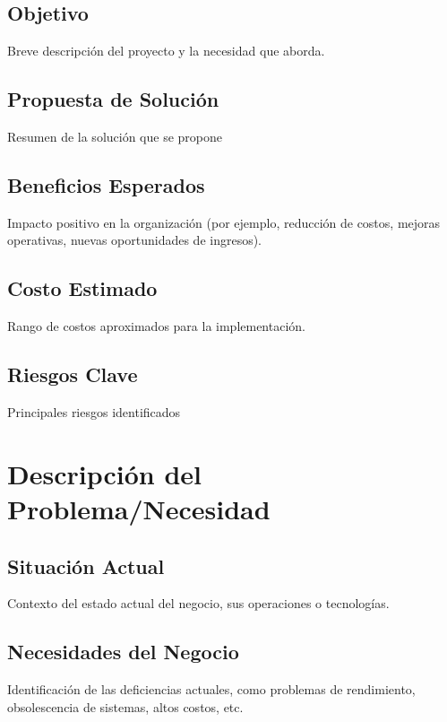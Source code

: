 \documentclass[a4paper,11pt]{article}
\begin{document}
\subsection{Objetivo}
Breve descripción del proyecto y la necesidad que aborda.

\subsection{Propuesta de Solución}
Resumen de la solución que se propone

\subsection{Beneficios Esperados}
Impacto positivo en la organización (por ejemplo, reducción de costos, mejoras operativas, nuevas oportunidades de ingresos).

\subsection{Costo Estimado}
Rango de costos aproximados para la implementación.

\subsection{Riesgos Clave}
Principales riesgos identificados


\titleformat{\section}{\normalfont\Large\bfseries}{\thesection}{1em}{}
\renewcommand{\thesection}{\Roman{section}}
\section{Descripción del Problema/Necesidad}
\titleformat{\section}{\normalfont\Large\bfseries}{\thesection}{1em}{}
\renewcommand{\thesection}{\arabic{section}}

\subsection{Situación Actual}
Contexto del estado actual del negocio, sus operaciones o tecnologías.
\subsection{Necesidades del Negocio}
Identificación de las deficiencias actuales, como problemas de rendimiento, obsolescencia de sistemas, altos costos, etc.
\end{document}
